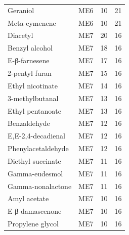 {\begin{longtable}{lrrr}
Geraniol & ME6 & 10 & 21 \\
Meta-cymenene & ME6 & 10 & 21 \\
Diacetyl & ME7 & 20 & 16 \\
Benzyl alcohol & ME7 & 18 & 16 \\
E-β-farnesene & ME7 & 17 & 16 \\
2-pentyl furan & ME7 & 15 & 16 \\
Ethyl nicotinate & ME7 & 14 & 16 \\
3-methylbutanal & ME7 & 13 & 16 \\
Ethyl pentanoate & ME7 & 13 & 16 \\
Benzaldehyde & ME7 & 12 & 16 \\
E,E-2,4-decadienal & ME7 & 12 & 16 \\
Phenylacetaldehyde & ME7 & 12 & 16 \\
Diethyl succinate & ME7 & 11 & 16 \\
Gamma-eudesmol & ME7 & 11 & 16 \\
Gamma-nonalactone & ME7 & 11 & 16 \\
Amyl acetate & ME7 & 10 & 16 \\
E-β-damascenone & ME7 & 10 & 16 \\
Propylene glycol & ME7 & 10 & 16 \\
\end{longtable}
}
